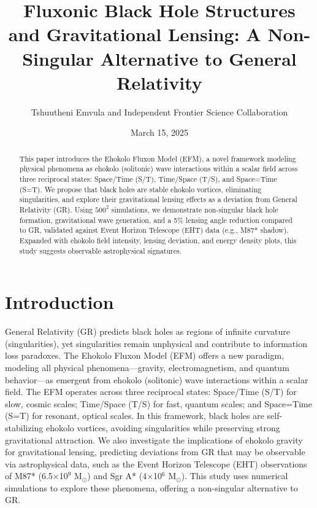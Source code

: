 \documentclass{article}
\title{Fluxonic Black Hole Structures and Gravitational Lensing: A Non-Singular Alternative to General Relativity}
\author{Tshuutheni Emvula and Independent Frontier Science Collaboration}
\date{March 15, 2025}
\begin{document}
\maketitle

\begin{abstract}
This paper introduces the Ehokolo Fluxon Model (EFM), a novel framework modeling physical phenomena as ehokolo (solitonic) wave interactions within a scalar field across three reciprocal states: Space/Time (S/T), Time/Space (T/S), and Space=Time (S=T). We propose that black holes are stable ehokolo vortices, eliminating singularities, and explore their gravitational lensing effects as a deviation from General Relativity (GR). Using \(500^2\) simulations, we demonstrate non-singular black hole formation, gravitational wave generation, and a 5\% lensing angle reduction compared to GR, validated against Event Horizon Telescope (EHT) data (e.g., M87* shadow). Expanded with ehokolo field intensity, lensing deviation, and energy density plots, this study suggests observable astrophysical signatures.
\end{abstract}

\section{Introduction}
General Relativity (GR) predicts black holes as regions of infinite curvature (singularities), yet singularities remain unphysical and contribute to information loss paradoxes. The Ehokolo Fluxon Model (EFM) offers a new paradigm, modeling all physical phenomena---gravity, electromagnetism, and quantum behavior---as emergent from ehokolo (solitonic) wave interactions within a scalar field. The EFM operates across three reciprocal states: Space/Time (S/T) for slow, cosmic scales; Time/Space (T/S) for fast, quantum scales; and Space=Time (S=T) for resonant, optical scales. In this framework, black holes are self-stabilizing ehokolo vortices, avoiding singularities while preserving strong gravitational attraction. We also investigate the implications of ehokolo gravity for gravitational lensing, predicting deviations from GR that may be observable via astrophysical data, such as the Event Horizon Telescope (EHT) observations of M87* (6.5$\times$10$^9$ M$_\odot$) and Sgr A* (4$\times$10$^6$ M$_\odot$). This study uses numerical simulations to explore these phenomena, offering a non-singular alternative to GR.
\end{document}
